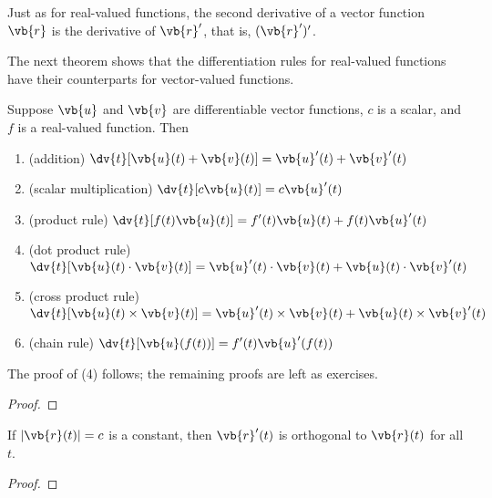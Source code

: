 Just as for real-valued functions, the second derivative of a vector function $\vb{r}$ is the derivative of $\vb{r}^\prime$, that is, $(\vb{r}^\prime)^\prime$.

The next theorem shows that the differentiation rules for real-valued functions have their counterparts for vector-valued functions.

\begin{theorem}
Suppose $\vb{u}$ and $\vb{v}$ are differentiable vector functions, $c$ is a scalar, and $f$ is a real-valued function. Then
\begin{enumerate}[label=(\arabic*)]
\item (addition) $\displaystyle\dv{t}[\vb{u}(t)+\vb{v}(t)]=\vb{u}^\prime(t)+\vb{v}^\prime(t)$
\item (scalar multiplication) $\displaystyle\dv{t}[c\vb{u}(t)]=c\vb{u}^\prime(t)$
\item (product rule) $\displaystyle\dv{t}[f(t)\vb{u}(t)]=f^\prime(t)\vb{u}(t)+f(t)\vb{u}^\prime(t)$
\item (dot product rule) $\displaystyle\dv{t}[\vb{u}(t)\cdot\vb{v}(t)]=\vb{u}^\prime(t)\cdot\vb{v}(t)+\vb{u}(t)\cdot\vb{v}^\prime(t)$
\item (cross product rule) $\displaystyle\dv{t}[\vb{u}(t)\times\vb{v}(t)]=\vb{u}^\prime(t)\times\vb{v}(t)+\vb{u}(t)\times\vb{v}^\prime(t)$
\item (chain rule) $\displaystyle\dv{t}[\vb{u}(f(t))]=f^\prime(t)\vb{u}^\prime(f(t))$
\end{enumerate}
\end{theorem}

The proof of (4) follows; the remaining proofs are left as exercises.

\begin{proof}

\end{proof}

\begin{lemma}
If $|\vb{r}(t)|=c$ is a constant, then $\vb{r}^\prime(t)$ is orthogonal to $\vb{r}(t)$ for all $t$.
\end{lemma}

\begin{proof}

\end{proof}